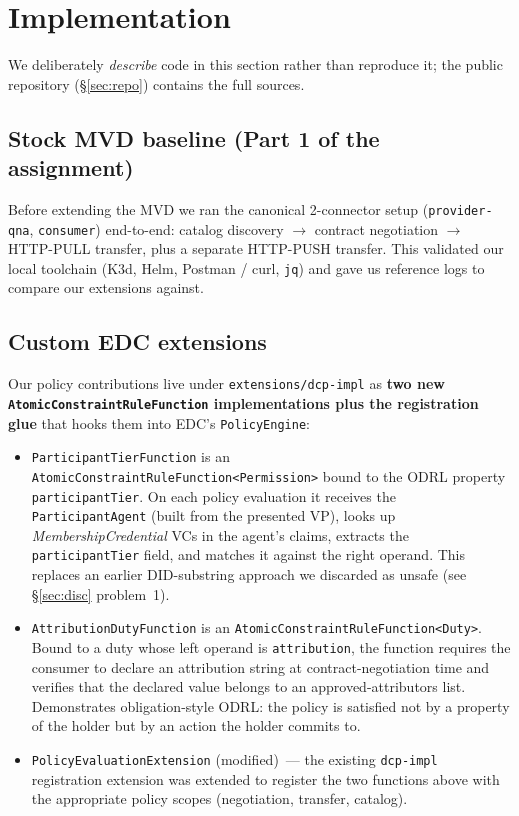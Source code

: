 \documentclass[11pt,a4paper]{article}
\DeclareRobustCommand{\code}[1]{\texttt{\small #1}}
\begin{document}
\section{Implementation}
\label{sec:impl}

We deliberately \emph{describe} code in this section rather than reproduce it;
the public repository (§\ref{sec:repo}) contains the full sources.

\subsection{Stock MVD baseline (Part 1 of the assignment)}

Before extending the MVD we ran the canonical 2-connector setup
(\code{provider-qna}, \code{consumer}) end-to-end: catalog discovery
$\rightarrow$ contract negotiation $\rightarrow$ HTTP-PULL transfer, plus a
separate HTTP-PUSH transfer. This validated our local toolchain (K3d, Helm,
Postman / curl, \code{jq}) and gave us reference logs to compare our
extensions against.

\subsection{Custom EDC extensions}
\label{sec:custom-ext}

Our policy contributions live under \code{extensions/dcp-impl} as \textbf{two
new \code{AtomicConstraintRuleFunction} implementations plus the registration
glue} that hooks them into EDC's \code{PolicyEngine}:

\begin{itemize}
  \item \code{ParticipantTierFunction} is an
    \code{AtomicConstraintRuleFunction<Permission>} bound to the ODRL property
    \code{participantTier}. On each policy evaluation it receives the
    \code{ParticipantAgent} (built from the presented VP), looks up
    \emph{MembershipCredential} VCs in the agent's claims, extracts the
    \code{participantTier} field, and matches it against the right operand.
    This replaces an earlier DID-substring approach we discarded as unsafe
    (see §\ref{sec:disc} problem~1).

  \item \code{AttributionDutyFunction} is an
    \code{AtomicConstraintRuleFunction<Duty>}. Bound to a duty whose left
    operand is \code{attribution}, the function requires the consumer to
    declare an attribution string at contract-negotiation time and
    verifies that the declared value belongs to an approved-attributors
    list. Demonstrates obligation-style ODRL: the policy is satisfied
    not by a property of the holder but by an action the holder commits
    to.

  \item \code{PolicyEvaluationExtension} (modified)~--- the existing
    \code{dcp-impl} registration extension was extended to register the two
    functions above with the appropriate policy scopes (negotiation, transfer,
    catalog).
\end{itemize}
\end{document}
